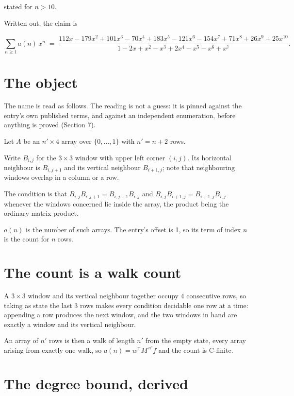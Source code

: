 \documentclass[11pt]{article}
\theoremstyle{definition}
\begin{document}
stated for $n > 10$.

Written out, the claim is

\[\sum_{n \ge 1} a(n)\,x^n \;=\; \frac{112x - 179x^{2} + 101x^{3} - 70x^{4} + 183x^{5} - 121x^{6} - 154x^{7} + 71x^{8} + 26x^{9} + 25x^{10}}{1 - 2x + x^{2} - x^{3} + 2x^{4} - x^{5} - x^{6} + x^{7}}.\]

\section{The object}

The name is read as follows. The reading is not a guess: it is pinned against the entry's own published terms, and against an independent enumeration, before anything is proved (Section 7).

Let $A$ be an $n' \times 4$ array over $\{0,\dots,1\}$ with $n' = n + 2$ rows.

Write $B_{i,j}$ for the $3\times3$ window with upper left corner $(i,j)$. Its horizontal neighbour is $B_{i,j+1}$ and its vertical neighbour $B_{i+1,j}$; note that neighbouring windows overlap in a column or a row.

The condition is that $B_{i,j}B_{i,j+1} = B_{i,j+1}B_{i,j}$ and $B_{i,j}B_{i+1,j} = B_{i+1,j}B_{i,j}$ whenever the windows concerned lie inside the array, the product being the ordinary matrix product.

$a(n)$ is the number of such arrays. The entry's offset is 1, so its term of index $n$ is the count for $n$ rows.

\section{The count is a walk count}

A $3\times3$ window and its vertical neighbour together occupy $4$ consecutive rows, so taking as state the last $3$ rows makes every condition decidable one row at a time: appending a row produces the next window, and the two windows in hand are exactly a window and its vertical neighbour.

An array of $n'$ rows is then a walk of length $n'$ from the empty state, every array arising from exactly one walk, so $a(n) = w^{\mathsf T}M^{\,n'}f$ and the count is C-finite.

\section{The degree bound, derived}
\end{document}
